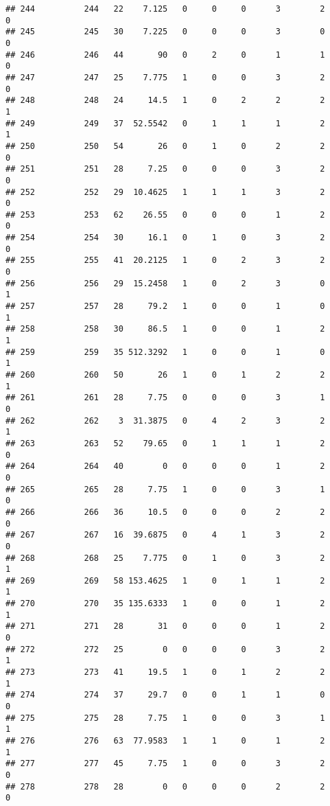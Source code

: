 \documentclass[
]{article}
\begin{document}
\begin{verbatim}
## 244          244   22    7.125   0     0     0      3        2         0
## 245          245   30    7.225   0     0     0      3        0         0
## 246          246   44       90   0     2     0      1        1         0
## 247          247   25    7.775   1     0     0      3        2         0
## 248          248   24     14.5   1     0     2      2        2         1
## 249          249   37  52.5542   0     1     1      1        2         1
## 250          250   54       26   0     1     0      2        2         0
## 251          251   28     7.25   0     0     0      3        2         0
## 252          252   29  10.4625   1     1     1      3        2         0
## 253          253   62    26.55   0     0     0      1        2         0
## 254          254   30     16.1   0     1     0      3        2         0
## 255          255   41  20.2125   1     0     2      3        2         0
## 256          256   29  15.2458   1     0     2      3        0         1
## 257          257   28     79.2   1     0     0      1        0         1
## 258          258   30     86.5   1     0     0      1        2         1
## 259          259   35 512.3292   1     0     0      1        0         1
## 260          260   50       26   1     0     1      2        2         1
## 261          261   28     7.75   0     0     0      3        1         0
## 262          262    3  31.3875   0     4     2      3        2         1
## 263          263   52    79.65   0     1     1      1        2         0
## 264          264   40        0   0     0     0      1        2         0
## 265          265   28     7.75   1     0     0      3        1         0
## 266          266   36     10.5   0     0     0      2        2         0
## 267          267   16  39.6875   0     4     1      3        2         0
## 268          268   25    7.775   0     1     0      3        2         1
## 269          269   58 153.4625   1     0     1      1        2         1
## 270          270   35 135.6333   1     0     0      1        2         1
## 271          271   28       31   0     0     0      1        2         0
## 272          272   25        0   0     0     0      3        2         1
## 273          273   41     19.5   1     0     1      2        2         1
## 274          274   37     29.7   0     0     1      1        0         0
## 275          275   28     7.75   1     0     0      3        1         1
## 276          276   63  77.9583   1     1     0      1        2         1
## 277          277   45     7.75   1     0     0      3        2         0
## 278          278   28        0   0     0     0      2        2         0

\end{verbatim}
\end{document}
